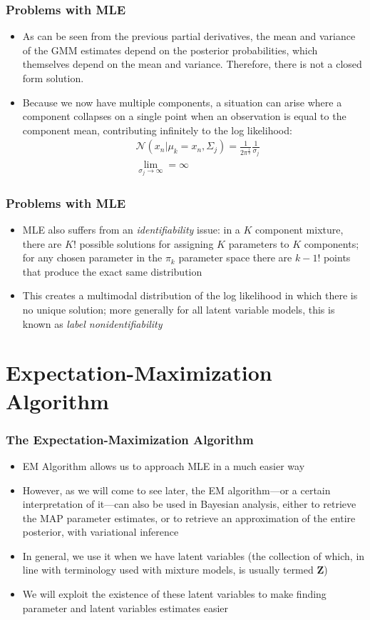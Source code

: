\documentclass{beamer}
\begin{document}
\begin{frame}
\frametitle{Problems with MLE}
\begin{itemize}
	\item As can be seen from the previous partial derivatives, the mean and variance of the GMM estimates depend on the posterior probabilities, which themselves depend on the mean and variance. Therefore, there is not a closed form solution.
	\item Because we now have multiple components, a situation can arise where a component collapses on a single point when an observation is equal to the component mean, contributing infinitely to the log likelihood:
	\begin{align*}
	&\mathcal{N}(x_n|\mu_k = x_n, \Sigma_j) = \frac{1}{2\pi^{\frac{1}{2}}}\frac{1}{\sigma_j}\\ 
	&\lim_{\sigma_j \to \infty} = \infty
	\end{align*}
\end{itemize}

\end{frame}

\begin{frame}
\frametitle{Problems with MLE}
	\begin{itemize}
		\item MLE also suffers from an \textit{identifiability} issue: in a $K$ component mixture, there are $K!$ possible solutions for assigning $K$ parameters to $K$ components; for any chosen parameter in the $\pi_k$ parameter space there are $k-1!$ points that produce the exact same distribution
		\item This creates a multimodal distribution of the log likelihood in which there is no unique solution; more generally for all latent variable models, this is known as \textit{label nonidentifiability}
	\end{itemize}
\end{frame}

\section{Expectation-Maximization Algorithm}

\begin{frame}
\frametitle{The Expectation-Maximization Algorithm}
	\begin{itemize}
		\item EM Algorithm allows us to approach MLE in a much easier way
		\item However, as we will come to see later, the EM algorithm---or a certain interpretation of it---can also be used in Bayesian analysis, either to retrieve the MAP parameter estimates, or to retrieve an approximation of the entire posterior, with variational inference
		\item In general, we use it when we have latent variables (the collection of which, in line with terminology used with mixture models, is usually termed $\mathbf{Z}$)
		\item We will exploit the existence of these latent variables to make finding parameter and latent variables estimates easier
	\end{itemize}
\end{frame}
\end{document}
